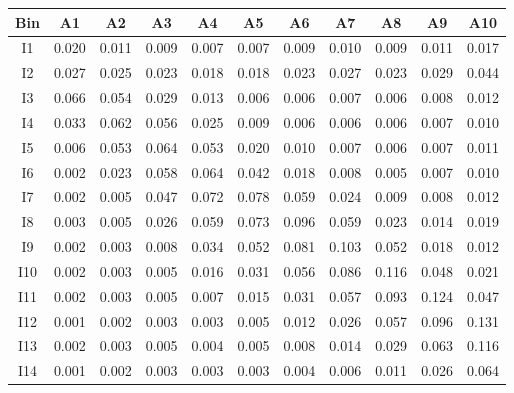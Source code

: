 \begin{tabular}{c@{~~~}c@{~~}c@{~~}c@{~~}c@{~~}c@{~~}c@{~~}c@{~~}c@{~~}c@{~~}c}
\hline 
 \hline 
Bin	& A1 & A2 & A3 & A4 & A5 & A6 & A7 & A8 & A9 & A10 \\ 
\hline 
I1	&  0.020 &  0.011 &  0.009 &  0.007 &  0.007 &  0.009 &  0.010 &  0.009 &  0.011 &  0.017 \\  
I2	&  0.027 &  0.025 &  0.023 &  0.018 &  0.018 &  0.023 &  0.027 &  0.023 &  0.029 &  0.044 \\  
I3	&  0.066 &  0.054 &  0.029 &  0.013 &  0.006 &  0.006 &  0.007 &  0.006 &  0.008 &  0.012 \\  
I4	&  0.033 &  0.062 &  0.056 &  0.025 &  0.009 &  0.006 &  0.006 &  0.006 &  0.007 &  0.010 \\  
I5	&  0.006 &  0.053 &  0.064 &  0.053 &  0.020 &  0.010 &  0.007 &  0.006 &  0.007 &  0.011 \\  
I6	&  0.002 &  0.023 &  0.058 &  0.064 &  0.042 &  0.018 &  0.008 &  0.005 &  0.007 &  0.010 \\  
I7	&  0.002 &  0.005 &  0.047 &  0.072 &  0.078 &  0.059 &  0.024 &  0.009 &  0.008 &  0.012 \\  
I8	&  0.003 &  0.005 &  0.026 &  0.059 &  0.073 &  0.096 &  0.059 &  0.023 &  0.014 &  0.019 \\  
I9	&  0.002 &  0.003 &  0.008 &  0.034 &  0.052 &  0.081 &  0.103 &  0.052 &  0.018 &  0.012 \\  
I10	&  0.002 &  0.003 &  0.005 &  0.016 &  0.031 &  0.056 &  0.086 &  0.116 &  0.048 &  0.021 \\  
I11	&  0.002 &  0.003 &  0.005 &  0.007 &  0.015 &  0.031 &  0.057 &  0.093 &  0.124 &  0.047 \\  
I12	&  0.001 &  0.002 &  0.003 &  0.003 &  0.005 &  0.012 &  0.026 &  0.057 &  0.096 &  0.131 \\  
I13	&  0.002 &  0.003 &  0.005 &  0.004 &  0.005 &  0.008 &  0.014 &  0.029 &  0.063 &  0.116 \\  
I14	&  0.001 &  0.002 &  0.003 &  0.003 &  0.003 &  0.004 &  0.006 &  0.011 &  0.026 &  0.064 \\  
\hline 
 \hline 
\end{tabular}